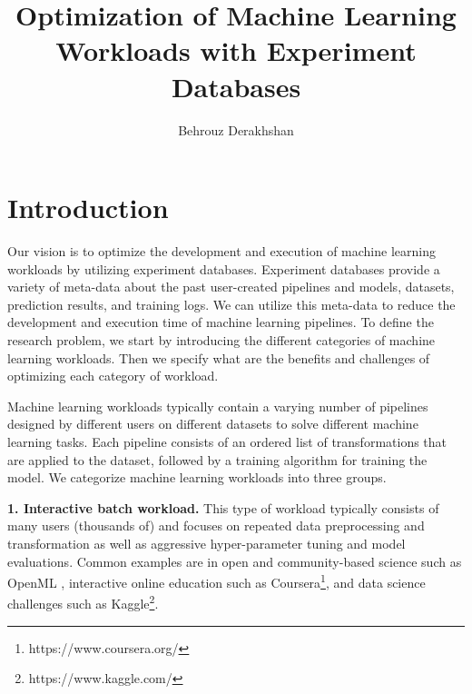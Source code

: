 \documentclass{sig-alternate-05-2015}
\begin{document}
\title{Optimization of Machine Learning Workloads with Experiment Databases}


\author{Behrouz Derakhshan}



\maketitle
\begin{abstract}
\end{abstract}

\section{Introduction} \label{introduction}
Our vision is to optimize the development and execution of machine learning workloads by utilizing experiment databases.
Experiment databases provide a variety of meta-data about the past user-created pipelines and models, datasets, prediction results, and training logs.
We can utilize this meta-data to reduce the development and execution time of machine learning pipelines.
To define the research problem, we start by introducing the different categories of machine learning workloads. 
Then we specify what are the benefits and challenges of optimizing each category of workload.

Machine learning workloads typically contain a varying number of pipelines designed by different users on different datasets to solve different machine learning tasks.
Each pipeline consists of an ordered list of transformations that are applied to the dataset, followed by a training algorithm for training the model.
We categorize machine learning workloads into three groups.

\textbf{1. Interactive batch workload. } 
This type of workload typically consists of many users (thousands of) and focuses on repeated data preprocessing and transformation as well as aggressive hyper-parameter tuning and model evaluations. Common examples are in open and community-based science such as OpenML \cite{vanschoren2014openml},  interactive online education such as Coursera\footnote{https://www.coursera.org/}, and data science challenges such as Kaggle\footnote{https://www.kaggle.com/}. 
\end{document}
